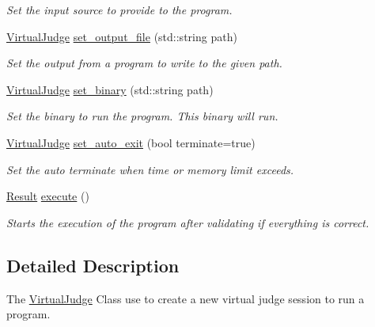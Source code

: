 \begin{DoxyCompactItemize}
\begin{DoxyCompactList}\small\item\em Set the input source to provide to the program. \end{DoxyCompactList}\item 
\hyperlink{classtestcaser_1_1integrator_1_1VirtualJudge}{Virtual\+Judge} \hyperlink{classtestcaser_1_1integrator_1_1VirtualJudge_a9f054aac69019e5f6bde646ccc72effb}{set\+\_\+output\+\_\+file} (std\+::string path)
\begin{DoxyCompactList}\small\item\em Set the output from a program to write to the given path. \end{DoxyCompactList}\item 
\hyperlink{classtestcaser_1_1integrator_1_1VirtualJudge}{Virtual\+Judge} \hyperlink{classtestcaser_1_1integrator_1_1VirtualJudge_ae9fc3d7bf1bf75fc1ec695fe831d16b6}{set\+\_\+binary} (std\+::string path)
\begin{DoxyCompactList}\small\item\em Set the binary to run the program. This binary will run. \end{DoxyCompactList}\item 
\hyperlink{classtestcaser_1_1integrator_1_1VirtualJudge}{Virtual\+Judge} \hyperlink{classtestcaser_1_1integrator_1_1VirtualJudge_a9160dd070c63084495fe6d29cab58cb4}{set\+\_\+auto\+\_\+exit} (bool terminate=true)
\begin{DoxyCompactList}\small\item\em Set the auto terminate when time or memory limit exceeds. \end{DoxyCompactList}\item 
\hyperlink{classtestcaser_1_1integrator_1_1Result}{Result} \hyperlink{classtestcaser_1_1integrator_1_1VirtualJudge_ab50e9c4506fba192fd44fce0f2a21744}{execute} ()
\begin{DoxyCompactList}\small\item\em Starts the execution of the program after validating if everything is correct. \end{DoxyCompactList}\end{DoxyCompactItemize}


\subsection{Detailed Description}
The \hyperlink{classtestcaser_1_1integrator_1_1VirtualJudge}{Virtual\+Judge} Class use to create a new virtual judge session to run a program. 

